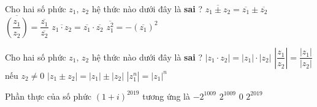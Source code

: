 \begin{ex}%
	Cho hai số phức $z_{1},\, z_{2}$   hệ thức nào dưới đây là \textbf{sai} ?
	\choice
	{$\overline{z_{1} \pm z_{2}}=\overline{z_{1}} \pm \overline{z_{2}}$}
	{$\overline{\left(\dfrac{z_{1}}{z_{2}}\right)}=\dfrac{\overline{z_{1}}}{\overline{z_{2}}}$}
	{$\overline{z_{1} \cdot z_{2}}=\overline{z_{1}} \cdot \overline{z_{2}}$}
	{\True $\overline{z_{1}^{2}}=-\left(\overline{z_{1}}\right)^{2}$}
\end{ex}

\begin{ex}%
	Cho hai số phức $z_{1},\, z_{2}$ hệ thức nào dưới đây là \textbf{sai} ?
	\choice
	{$\left|z_{1} \cdot z_{2}\right|=\left|z_{1}\right| \cdot\left|z_{2}\right|$}
	{$\left|\dfrac{z_{1}}{z_{2}}\right|=\dfrac{\left|z_{1}\right|}{\left|z_{2}\right|}$ nếu $z_{2} \neq 0$}
	{\True $\left|z_{1} \pm z_{2}\right|=\left|z_{1}\right| \pm\left|z_{2}\right|$}
	{$\left|z_{1}^{n}\right|=\left|z_{1}\right|^{n}$}
\end{ex}

\begin{ex}%
	Phần thực của số phức $(1+i)^{2019}$ tương ứng là
	\choice
	{\True$-2^{1009}$}
	{$2^{1009}$}
	{$0$}
	{$2^{2019}$}
\end{ex}

